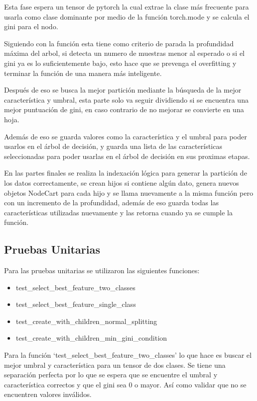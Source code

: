 \documentclass[12pt,a4paper]{article}
\begin{document}
Esta fase espera un tensor de pytorch la cual extrae la clase más frecuente para usarla
como clase dominante por medio de la función torch.mode
y se calcula el gini para el nodo.

Siguiendo con la función esta tiene como criterio de parada la profundidad máxima del arbol, si detecta un numero de muestras
menor al esperado o si el gini ya es lo suficientemente bajo, esto hace que se prevenga el overfitting y terminar
la función de una manera más inteligente.

Después de eso se busca la mejor partición mediante la búsqueda de la mejor característica y umbral, esta parte solo
va seguir dividiendo si se encuentra una mejor puntuación de gini, en caso contrario de no mejorar
se convierte en una hoja.

Además de eso se guarda valores como la característica y el umbral para poder usarlos en el árbol de decisión, y
guarda una lista de las características seleccionadas para poder usarlas en el árbol de decisión en sus proximas etapas.

En las partes finales se realiza la indexación lógica para generar la partición de los datos correctamente, se
crean hijos si contiene algún dato, genera nuevos objetos NodeCart para cada hijo y se llama nuevamente a la misma función
pero con un incremento de la profundidad, además de eso guarda todas las características utilizadas nuevamente
y las retorna cuando ya se cumple la función.

\subsection{Pruebas Unitarias}\label{subsec:pruebas-unitarias}

Para las pruebas unitarias se utilizaron las siguientes funciones:

\begin{itemize}
  \item test_select_best_feature_two_classes
  \item test_select_best_feature_single_class
  \item test_create_with_children_normal_splitting
  \item test_create_with_children_min_gini_condition
\end{itemize}

Para la función `test_select_best_feature_two_classes' lo que hace es buscar el mejor umbral
y característica para un tensor de dos clases. Se tiene una separación perfecta por lo que
se espera que se encuentre el umbral y característica correctos y que el gini sea 0 o mayor.
Así como validar que no se encuentren valores inválidos.
\end{document}
